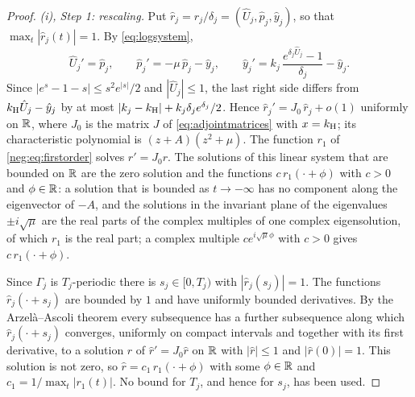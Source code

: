 \begin{proof}
\emph{(i), Step 1: rescaling.} Put $\hat r_j=r_j/\delta_j=(\hat U_j,\hat p_j,\hat y_j)$, so that $\max_t|\hat r_j(t)|=1$. By \eqref{eq:logsystem},
\[
\hat U_j'=\hat p_j,\qquad \hat p_j'=-\mu\,\hat p_j-\hat y_j,\qquad \hat y_j'=k_j\,\frac{e^{\delta_j\hat U_j}-1}{\delta_j}-\hat y_j .
\]
Since $|e^{s}-1-s|\le s^2e^{|s|}/2$ and $|\hat U_j|\le1$, the last right side differs from $k_{\mathrm H}\hat U_j-\hat y_j$ by at most $|k_j-k_{\mathrm H}|+k_j\delta_je^{\delta_j}/2$. Hence $\hat r_j'=J_0\,\hat r_j+o(1)$ uniformly on $\mathbb R$, where $J_0$ is the matrix $J$ of \eqref{eq:adjointmatrices} with $x=k_{\mathrm H}$; its characteristic polynomial is $(z+A)(z^2+\mu)$. The function $r_1$ of \eqref{neg:eq:firstorder} solves $r'=J_0r$. The solutions of this linear system that are bounded on $\mathbb R$ are the zero solution and the functions $c\,r_1(\cdot+\phi)$ with $c>0$ and $\phi\in\mathbb R$: a solution that is bounded as $t\to-\infty$ has no component along the eigenvector of $-A$, and the solutions in the invariant plane of the eigenvalues $\pm i\sqrt\mu$ are the real parts of the complex multiples of one complex eigensolution, of which $r_1$ is the real part; a complex multiple $ce^{i\sqrt\mu\phi}$ with $c>0$ gives $c\,r_1(\cdot+\phi)$.

Since $\Gamma_j$ is $T_j$-periodic there is $s_j\in[0,T_j)$ with $|\hat r_j(s_j)|=1$. The functions $\hat r_j(\cdot+s_j)$ are bounded by $1$ and have uniformly bounded derivatives. By the Arzel\`a--Ascoli theorem every subsequence has a further subsequence along which $\hat r_j(\cdot+s_j)$ converges, uniformly on compact intervals and together with its first derivative, to a solution $\hat r$ of $\hat r'=J_0\hat r$ on $\mathbb R$ with $|\hat r|\le1$ and $|\hat r(0)|=1$. This solution is not zero, so $\hat r=c_1\,r_1(\cdot+\phi)$ with some $\phi\in\mathbb R$ and $c_1=1/\max_t|r_1(t)|$. No bound for $T_j$, and hence for $s_j$, has been used.


\end{proof}
